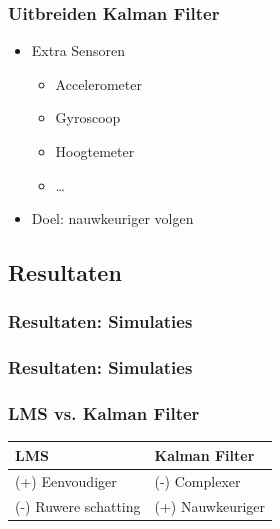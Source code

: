 \documentclass{beamer}
\begin{document}
  \begin{frame}
    \frametitle{Uitbreiden Kalman Filter}
    \begin{itemize}
      \item Extra Sensoren
        \begin{itemize}
          \item Accelerometer
          \item Gyroscoop
          \item Hoogtemeter
          \item \ldots
        \end{itemize}
      \item Doel: nauwkeuriger volgen
    \end{itemize}
  \end{frame}
\subsection{Resultaten}
  \begin{frame}
    \frametitle{Resultaten: Simulaties}
  \end{frame}
  \begin{frame}
    \frametitle{Resultaten: Simulaties}
  \end{frame}
  \begin{frame}
    \frametitle{LMS vs. Kalman Filter}
    \begin{tabular}{|l|l|}
      \hline
      LMS & Kalman Filter \\
      \hline
      (+) Eenvoudiger & (-) Complexer \\
      (-) Ruwere schatting & (+) Nauwkeuriger \\
      \hline
    \end{tabular}
  \end{frame}
\end{document}
